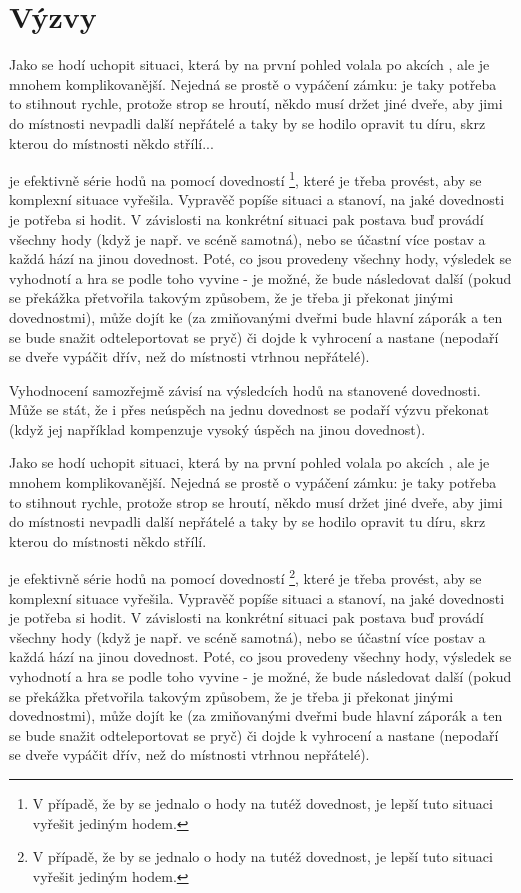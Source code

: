 \documentclass[../main.tex]{subfiles}
\begin{document}
\section{Výzvy}
\label{sec:vyzvy}

Jako  se hodí uchopit situaci, která by na první pohled volala po akcích , ale je mnohem komplikovanější. Nejedná se prostě o vypáčení zámku: je taky potřeba to stihnout rychle, protože strop se hroutí, někdo musí držet jiné dveře, aby jimi do místnosti nevpadli další nepřátelé a taky by se hodilo opravit tu díru, skrz kterou do místnosti někdo střílí...

 je efektivně série hodů na  pomocí  dovedností \footnote{V případě, že by se jednalo o hody na tutéž dovednost, je lepší tuto situaci vyřešit jediným hodem.}, které je třeba provést, aby se komplexní situace vyřešila. Vypravěč popíše situaci a stanoví, na jaké dovednosti je potřeba si hodit. V závislosti na konkrétní situaci pak postava buď provádí všechny hody (když je např. ve scéně samotná), nebo se  účastní více postav a každá hází na jinou dovednost. Poté, co jsou provedeny všechny hody, výsledek  se vyhodnotí a hra se podle toho vyvine - je možné, že bude následovat další  (pokud se překážka přetvořila takovým způsobem, že je třeba ji překonat jinými dovednostmi), může dojít ke  (za zmiňovanými dveřmi bude hlavní záporák a ten se bude snažit odteleportovat se pryč) či dojde k vyhrocení a nastane  (nepodaří se dveře vypáčit dřív, než do místnosti vtrhnou nepřátelé).

Vyhodnocení  samozřejmě závisí na výsledcích hodů na stanovené dovednosti. Může se stát, že i přes neúspěch na jednu dovednost se podaří výzvu překonat (když jej například kompenzuje vysoký úspěch na jinou dovednost).

Jako  se hodí uchopit situaci, která by na první pohled volala po akcích , ale je mnohem komplikovanější. Nejedná se prostě o vypáčení zámku: je taky potřeba to stihnout rychle, protože strop se hroutí, někdo musí držet jiné dveře, aby jimi do místnosti nevpadli další nepřátelé a taky by se hodilo opravit tu díru, skrz kterou do místnosti někdo střílí.

 je efektivně série hodů na  pomocí  dovedností \footnote{V případě, že by se jednalo o hody na tutéž dovednost, je lepší tuto situaci vyřešit jediným hodem.}, které je třeba provést, aby se komplexní situace vyřešila. Vypravěč popíše situaci a stanoví, na jaké dovednosti je potřeba si hodit. V závislosti na konkrétní situaci pak postava buď provádí všechny hody (když je např. ve scéně samotná), nebo se  účastní více postav a každá hází na jinou dovednost. Poté, co jsou provedeny všechny hody, výsledek  se vyhodnotí a hra se podle toho vyvine - je možné, že bude následovat další  (pokud se překážka přetvořila takovým způsobem, že je třeba ji překonat jinými dovednostmi), může dojít ke  (za zmiňovanými dveřmi bude hlavní záporák a ten se bude snažit odteleportovat se pryč) či dojde k vyhrocení a nastane  (nepodaří se dveře vypáčit dřív, než do místnosti vtrhnou nepřátelé).
\end{document}
